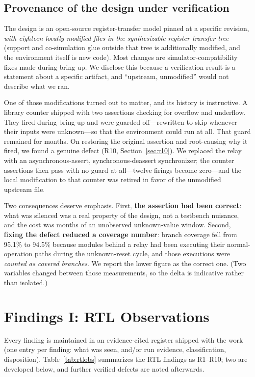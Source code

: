 \documentclass[conference]{IEEEtran}
\newcommand{\code}[1]{\texttt{\detokenize{#1}}}
\begin{document}
\subsection{Provenance of the design under verification}
\label{sec:provenance}
The design is an open-source register-transfer model pinned at a
specific revision, \emph{with eighteen locally modified files in the
	synthesizable register-transfer tree} (support and co-simulation glue
outside that tree is additionally modified, and the environment itself
is new code). Most changes are simulator-compatibility fixes made
during bring-up. We disclose this because a verification result is a
statement about a specific artifact, and ``upstream, unmodified'' would
not describe what we ran.

One of those modifications turned out to matter, and its history is
instructive. A library counter shipped with two assertions checking for
overflow and underflow. They fired during bring-up and were guarded
off---rewritten to skip whenever their inputs were unknown---so that the
environment could run at all. That guard remained for months. On
restoring the original assertion and root-causing why it fired, we found
a genuine defect (R10, Section~\ref{sec:r10}). We replaced the relay
with an asynchronous-assert, synchronous-deassert synchronizer; the
counter assertions then pass with no guard at all---twelve firings
become zero---and the local modification to that counter was retired in
favor of the unmodified upstream file.

Two consequences deserve emphasis. First, \textbf{the assertion had been
	correct}: what was silenced was a real property of the design, not a
testbench nuisance, and the cost was months of an unobserved
unknown-value window. Second, \textbf{fixing the defect reduced a
	coverage number}: branch coverage fell from 95.1\% to 94.5\% because
modules behind a relay had been executing their normal-operation paths
during the unknown-reset cycle, and those executions were \emph{counted
	as covered branches}. We report the lower figure as the correct one.
(Two variables changed between those measurements, so the delta is
indicative rather than isolated.)

\section{Findings I: RTL Observations}
\label{sec:rtlfindings}

Every finding is maintained in an evidence-cited register shipped with
the work (one entry per finding: what was seen, \code{file:line} and/or
run evidence, classification, disposition). Table~\ref{tab:rtlobs}
summarizes the RTL findings as R1--R10; two are developed below, and
further verified defects are noted afterwards.
\end{document}
